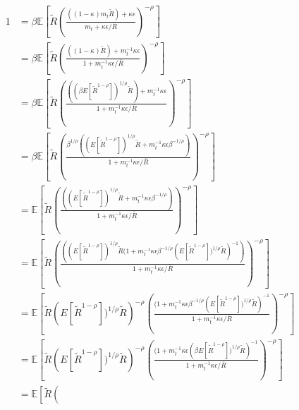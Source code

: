 \documentclass{article}
\begin{document}
\medskip



\begin{align}
  1 &= \beta \mathbb{E}\left[\tilde{R}
      \left(
      \frac
      {((1-\kappa)m_{t}\tilde{R})+\kappa\epsilon}
      {m_{t}+\kappa\epsilon/\bar{R}}
      \right)^{-\rho}
      \right]
  \\
   &= \beta \mathbb{E}\left[\tilde{R}
      \left(
      \frac
      {((1-\kappa)\tilde{R})+m_{t}^{-1}\kappa\epsilon }
      {1+m_{t}^{-1}\kappa\epsilon/\bar{R}}
      \right)^{-\rho}
      \right]
  \\
   &= \beta \mathbb{E}\left[\tilde{R}
      \left(
      \frac
      {((\beta E[\tilde{R}^{1-\rho}])^{1/\rho}\tilde{R})+m_{t}^{-1}\kappa\epsilon }
      {1+m_{t}^{-1}\kappa\epsilon/\bar{R}}
      \right)^{-\rho}
      \right] \\
   &= \beta \mathbb{E}\left[\tilde{R}
      \left(
      \frac
     {\beta^{1/\rho}\left(
     (E[\tilde{R}^{1-\rho}])^{1/\rho}\tilde{R}+m_{t}^{-1}\kappa\epsilon \beta^{-1/\rho}\right)}
      {1+m_{t}^{-1}\kappa\epsilon/\bar{R}}
      \right)^{-\rho}
      \right]
  \\
   &= \mathbb{E}\left[\tilde{R}
      \left(
      \frac
     {\left(
     (E[\tilde{R}^{1-\rho}])^{1/\rho}\tilde{R}+m_{t}^{-1}\kappa\epsilon \beta^{-1/\rho}\right)}
      {1+m_{t}^{-1}\kappa\epsilon/\bar{R}}
      \right)^{-\rho}
      \right]
  \\
   &= \mathbb{E}\left[\tilde{R}
      \left(
      \frac
     {\left(
     (E[\tilde{R}^{1-\rho}])^{1/\rho}\tilde{R}(1+m_{t}^{-1}\kappa\epsilon \beta^{-1/\rho} \left(E[\tilde{R}^{1-\rho}])^{1/\rho}\tilde{R}\right)^{-1}\right)}
      {1+m_{t}^{-1}\kappa\epsilon/\bar{R}}
      \right)^{-\rho}
      \right]
  \\
   &= \mathbb{E}\left[\tilde{R}
      \left(
     E[\tilde{R}^{1-\rho}])^{1/\rho}\tilde{R}\right)^{-\rho}\left(
     \frac
     {
     (1+m_{t}^{-1}\kappa\epsilon \beta^{-1/\rho} \left(E[\tilde{R}^{1-\rho}])^{1/\rho}\tilde{R}\right)^{-1}}
      {1+m_{t}^{-1}\kappa\epsilon/\bar{R}}
      \right)^{-\rho}
      \right]
  \\
   &= \mathbb{E}\left[\tilde{R}
      \left(
     E[\tilde{R}^{1-\rho}])^{1/\rho}\tilde{R}\right)^{-\rho}\left(
     \frac
     {
     (1+m_{t}^{-1}\kappa\epsilon \left(\beta E[\tilde{R}^{1-\rho}])^{1/\rho}\tilde{R}\right)^{-1}}
      {1+m_{t}^{-1}\kappa\epsilon/\bar{R}}
      \right)^{-\rho}
      \right]
  \\
   &= \mathbb{E}\left[\tilde{R}
      \left(

\end{align}
\end{document}
